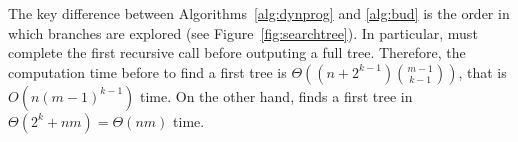 \documentclass{llncs}
\newcommand{\features}{\ensuremath{{\mathcal F}}\xspace}
\newcommand{\sequence}[0]{\ensuremath{{\cal S}}}
\newcommand{\afeat}[0]{\ensuremath{f}}
\newcommand{\dom}[1][]{\ensuremath{\ifthenelse{\equal{#1}{}}{dom}{dom({#1})}}}
\newcommand{\best}[1][]{\ensuremath{\ifthenelse{\equal{#1}{}}{{best}}{{best({#1})}}}}
\newcommand{\error}[1][]{\ensuremath{\ifthenelse{\equal{#1}{}}{{error}}{{error({{#1}})}}}}
\newcommand{\abranch}[0]{\ensuremath{b}}
\newcommand{\numex}[0]{\ensuremath{n}}
\newcommand{\numfeat}[0]{\ensuremath{m}}
\newcommand{\mdepth}[0]{\ensuremath{k}}
\newcommand{\grow}[2]{\ensuremath{{#1}\oplus{#2}}}
\begin{document}
			\medskip
			
			The key difference between Algorithms~\ref{alg:dynprog} and \ref{alg:bud} is the order in which branches are explored (see Figure~\ref{fig:searchtree}). In particular, \dynprog must complete the first recursive call before outputing a full tree. Therefore, the computation time before to find a first tree is $\Theta((\numex+2^{\mdepth-1}){\numfeat-1 \choose \mdepth-1})$, that is $O(\numex(\numfeat-1)^{\mdepth-1})$ time. On the other hand, \budalg finds a first tree in $\Theta(2^{\mdepth}+\numex\numfeat) = \Theta(\numex\numfeat)$ time.
			
			
		
			
			
			
%
%
%
%
%
%
%
%
%
%
%
%
%
%
%
%
%
%
%
\end{document}
